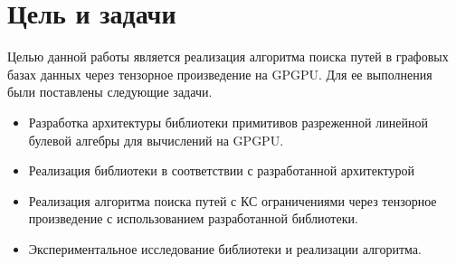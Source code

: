 \section{Цель и задачи}

Целью данной работы является реализация алгоритма поиска путей в графовых базах данных через тензорное произведение на GPGPU. Для ее выполнения были поставлены следующие задачи.

\begin{itemize}
    \item Разработка архитектуры библиотеки примитивов разреженной линейной булевой алгебры для вычислений на GPGPU.
    \item Реализация библиотеки в соответствии с разработанной архитектурой
    \item Реализация алгоритма поиска путей с КС ограничениями через тензорное произведение с использованием разработанной библиотеки.
    \item Экспериментальное исследование библиотеки и реализации алгоритма.
\end{itemize}